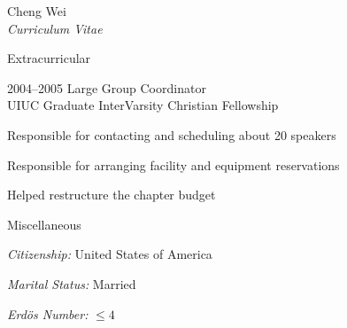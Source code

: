 \documentclass[10pt]{article}
\newenvironment{subbulletlist}{%
	\begin{list}{\labelitemii}{%
		\setlength{\topsep}{\itemsep}\setlength{\parskip}{\parsep}%
	}%
}%
{ \end{list} }
\begin{document}
\begin{cv}{Cheng Wei\\{\large \itshape Curriculum Vitae}}
\begin{cvlist}{Extracurricular}
	\item[2004--2005] Large Group Coordinator\\
	UIUC Graduate InterVarsity Christian Fellowship
	\begin{subbulletlist}
	\item Responsible for contacting and scheduling about 20 
	speakers 
	\item Responsible for arranging facility and equipment
	reservations
	\item Helped restructure the chapter budget
	\end{subbulletlist}
\end{cvlist}

\setlength{\oldcvlabelwidth}{\cvlabelwidth}
\setlength{\cvlabelwidth}{1em}
\begin{cvlist}{Miscellaneous}
\item \textit{Citizenship:} United States of America
\item \textit{Marital Status:} Married
\item \textit{Erd\"{o}s Number:} $\leq 4$
\end{cvlist}
\setlength{\cvlabelwidth}{\oldcvlabelwidth}

\end{cv}
\end{document}
